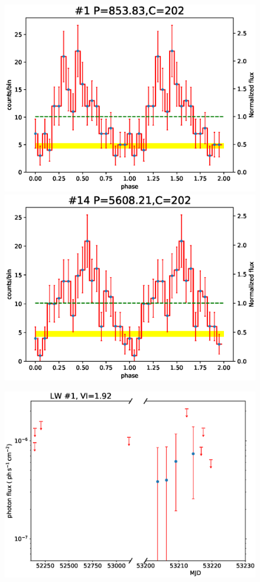 \documentclass[fleqn,usenatbib]{mnras}
\begin{document}
\begin{figure}
\begin{minipage}[b]{0.45\textwidth}
\includegraphics[width=\textwidth]{./figure/LW/pfold_lc_324001.eps}
\includegraphics[width=\textwidth]{./figure/LW/pfold_lc_324002.eps}
\end{minipage}
\begin{minipage}[b]{0.44\textwidth}
\includegraphics[width=\textwidth]{./figure/LW/324001_lc.eps}

\end{minipage}
\end{figure}
\end{document}
